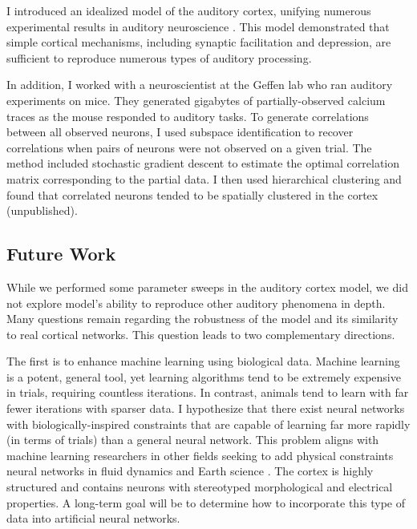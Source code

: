 \documentclass[a4paper,11pt]{article}
\begin{document}
	I introduced an idealized model of the auditory cortex, unifying numerous experimental results in auditory neuroscience \cite{park2020circuit}. This model demonstrated that simple cortical mechanisms, including synaptic facilitation and depression, are sufficient to reproduce numerous types of auditory processing.
	
	In addition, I worked with a neuroscientist at the Geffen lab who ran auditory experiments on mice. They generated gigabytes of partially-observed calcium traces as the mouse responded to auditory tasks. To generate correlations between all observed neurons, I used subspace identification to recover correlations when pairs of neurons were not observed on a given trial. The method included stochastic gradient descent to estimate the optimal correlation matrix corresponding to the partial data. I then used hierarchical clustering and found that correlated neurons tended to be spatially clustered in the cortex (unpublished).
	
	\subsection{Future Work}
	While we performed some parameter sweeps in the auditory cortex model, we did not explore model's ability to reproduce other auditory phenomena in depth. Many questions remain regarding the robustness of the model and its similarity to real cortical networks. This question leads to two complementary directions.
	
	The first is to enhance machine learning using biological data. Machine learning is a potent, general tool, yet learning algorithms tend to be extremely expensive in trials, requiring countless iterations. In contrast, animals tend to learn with far fewer iterations with sparser data. I hypothesize that there exist neural networks with biologically-inspired constraints that are capable of learning far more rapidly (in terms of trials) than a general neural network. This problem aligns with machine learning researchers in other fields seeking to add physical constraints neural networks in fluid dynamics \cite{mohan2020embedding} and Earth science \cite{pelissier2020combining}. The cortex is highly structured and contains neurons with stereotyped morphological and electrical properties. A long-term goal will be to determine how to incorporate this type of data into artificial neural networks.
	
\end{document}
